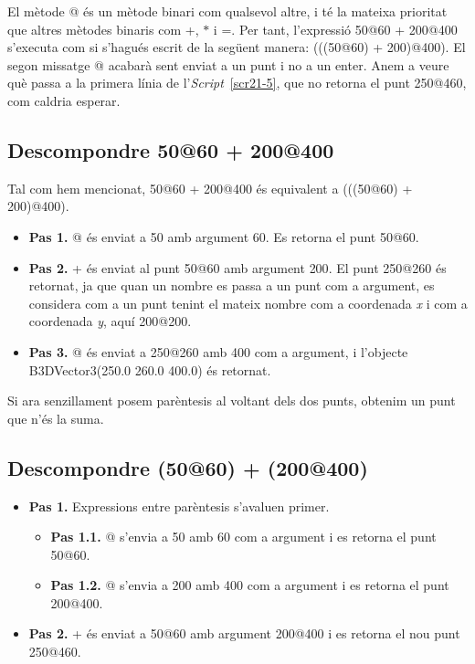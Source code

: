 El mètode \textsf{@} és un mètode binari com qualsevol altre, i té la mateixa prioritat que altres mètodes binaris com \textsf{+},  \textsf{$*$} i  \textsf{=}. Per tant, l'expressió  \textsf{50@60 + 200@400} s'executa com si s'hagués escrit de la següent manera: \textsf{(((50@60) + 200)@400)}. El segon missatge  \textsf{@} acabarà sent enviat a un punt i no a un enter. Anem a veure què passa a la primera línia de l'\emph{Script}~\ref{scr21-5}, que no retorna el punt \textsf{250@460}, com caldria esperar.
\subsection{Descompondre \textsf{50@60 + 200@400}}
Tal com hem mencionat, \textsf{50@60 + 200@400} és equivalent a \textsf{(((50@60) + 200)@400)}.
\begin{itemize}
\item[] \textbf{Pas 1.} \textsf{@} és enviat a \textsf{50} amb argument \textsf{60}. Es retorna el punt \textsf{50@60}.
\item[] \textbf{Pas 2.} \textsf{+} és enviat al punt \textsf{50@60} amb argument \textsf{200}. El punt \textsf{250@260} és retornat, ja que quan un nombre es passa a un punt com a argument, es considera com a un punt tenint el mateix nombre com a coordenada \emph{x} i com a coordenada \emph{y}, aquí \textsf{200@200}.
\item[] \textbf{Pas 3.} \textsf{@} és enviat a \textsf{250@260} amb 400 com a argument, i l'objecte \textsf{B3DVector3(250.0 260.0 400.0)} és retornat.
\end{itemize}

Si ara senzillament posem parèntesis al voltant dels dos punts, obtenim un punt que n'és la suma.

\subsection{Descompondre \textsf{(50@60) + (200@400)}}
\begin{itemize}
\item[] \textbf{Pas 1.} Expressions entre parèntesis s'avaluen primer. 
\begin{itemize} 
\item[] \textbf{Pas 1.1.} \textsf{@} s'envia a \textsf{50} amb \textsf{60} com a argument i es retorna el punt \textsf{50@60}.  
\item[] \textbf{Pas 1.2.} \textsf{@} s'envia a \textsf{200} amb \textsf{400} com a argument i es retorna el punt \textsf{200@400}.  
\end{itemize}
\item[] \textbf{Pas 2.} \textsf{+} és enviat a \textsf{50@60} amb argument \textsf{200@400} i es retorna el nou punt \textsf{250@460}.
\end{itemize}

